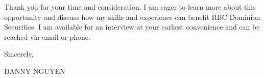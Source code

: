 \documentclass[letterpaper,11pt]{article}
\begin{document}
\vspace{10pt}

Thank you for your time and consideration. I am eager to learn more about this opportunity and discuss how my skills and experience can benefit RBC Dominion Securities. I am available for an interview at your earliest convenience and can be reached via email or phone.

\vspace{20pt}

Sincerely, \\
\vspace{40pt}

DANNY NGUYEN
\end{document}
